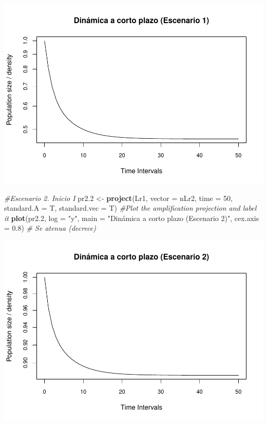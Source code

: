 \documentclass[
]{book}
\newenvironment{Shaded}{\begin{snugshade}}{\end{snugshade}}
\newcommand{\AttributeTok}[1]{\textcolor[rgb]{0.13,0.29,0.53}{#1}}
\newcommand{\CommentTok}[1]{\textcolor[rgb]{0.56,0.35,0.01}{\textit{#1}}}
\newcommand{\DecValTok}[1]{\textcolor[rgb]{0.00,0.00,0.81}{#1}}
\newcommand{\FloatTok}[1]{\textcolor[rgb]{0.00,0.00,0.81}{#1}}
\newcommand{\FunctionTok}[1]{\textcolor[rgb]{0.13,0.29,0.53}{\textbf{#1}}}
\newcommand{\NormalTok}[1]{#1}
\newcommand{\OtherTok}[1]{\textcolor[rgb]{0.56,0.35,0.01}{#1}}
\newcommand{\StringTok}[1]{\textcolor[rgb]{0.31,0.60,0.02}{#1}}
\theoremstyle{definition}
\theoremstyle{definition}
\theoremstyle{definition}
\theoremstyle{definition}
\theoremstyle{remark}
\begin{document}
\includegraphics{Diagnostico_Poblacional_files/figure-latex/chap10_5-1.pdf}

\begin{Shaded}
\begin{Highlighting}[]
\CommentTok{\#Escenario 2. Inicio I}
\NormalTok{pr2}\FloatTok{.2} \OtherTok{\textless{}{-}} \FunctionTok{project}\NormalTok{(Lr1, }\AttributeTok{vector =}\NormalTok{ nLr2, }\AttributeTok{time =} \DecValTok{50}\NormalTok{, }
                 \AttributeTok{standard.A =}\NormalTok{ T, }\AttributeTok{standard.vec =}\NormalTok{ T)}
\CommentTok{\#Plot the amplification projection and label it}
\FunctionTok{plot}\NormalTok{(pr2}\FloatTok{.2}\NormalTok{, }\AttributeTok{log =} \StringTok{"y"}\NormalTok{, }\AttributeTok{main =} \StringTok{"Dinámica a corto plazo (Escenario 2)"}\NormalTok{, }\AttributeTok{cex.axis =} \FloatTok{0.8}\NormalTok{) }\CommentTok{\# Se atenua (decrece)}
\end{Highlighting}
\end{Shaded}

\includegraphics{Diagnostico_Poblacional_files/figure-latex/chap10_5-2.pdf}
\end{document}
